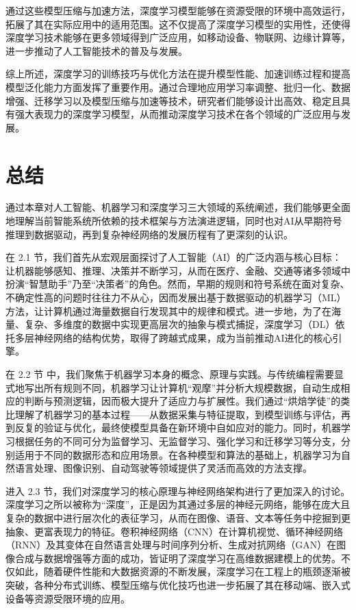通过这些模型压缩与加速方法，深度学习模型能够在资源受限的环境中高效运行，拓展了其在实际应用中的适用范围。这不仅提高了深度学习模型的实用性，还使得深度学习技术能够在更多领域得到广泛应用，如移动设备、物联网、边缘计算等，进一步推动了人工智能技术的普及与发展。

综上所述，深度学习的训练技巧与优化方法在提升模型性能、加速训练过程和提高模型泛化能力方面发挥了重要作用。通过合理地应用学习率调整、批归一化、数据增强、迁移学习以及模型压缩与加速等技术，研究者们能够设计出高效、稳定且具有强大表现力的深度学习模型，从而推动深度学习技术在各个领域的广泛应用与发展。

\section{总结}
通过本章对人工智能、机器学习和深度学习三大领域的系统阐述，我们能够更全面地理解当前智能系统所依赖的技术框架与方法演进逻辑，同时也对AI从早期符号推理到数据驱动，再到复杂神经网络的发展历程有了更深刻的认识。

在 2.1 节，我们首先从宏观层面探讨了人工智能（AI）的广泛内涵与核心目标：让机器能够感知、推理、决策并不断学习，从而在医疗、金融、交通等诸多领域中扮演“智慧助手”乃至“决策者”的角色。然而，早期的规则和符号系统在面对复杂、不确定性高的问题时往往力不从心，因而发展出基于数据驱动的机器学习（ML）方法，让计算机通过海量数据自行发现其中的规律和模式。进一步地，为了在海量、复杂、多维度的数据中实现更高层次的抽象与模式捕捉，深度学习（DL）依托多层神经网络的结构优势，取得了跨越式成果，成为当前推动AI进化的核心引擎。

在 2.2 节 中，我们聚焦于机器学习本身的概念、原理与实践。与传统编程需要显式地写出所有规则不同，机器学习让计算机“观摩”并分析大规模数据，自动生成相应的判断与预测逻辑，因而极大提升了适应力与扩展性。我们通过“烘焙学徒”的类比理解了机器学习的基本过程——从数据采集与特征提取，到模型训练与评估，再到反复的验证与优化，最终使模型具备在新环境中自如应对的能力。同时，机器学习根据任务的不同可分为监督学习、无监督学习、强化学习和迁移学习等分支，分别适用于不同的数据形态和应用场景。在各种模型和算法的基础上，机器学习为自然语言处理、图像识别、自动驾驶等领域提供了灵活而高效的方法支撑。

进入 2.3 节，我们对深度学习的核心原理与神经网络架构进行了更加深入的讨论。深度学习之所以被称为“深度”，正是因为其通过多层的神经元网络，能够在庞大且复杂的数据中进行层次化的表征学习，从而在图像、语音、文本等任务中挖掘到更抽象、更富表现力的特征。卷积神经网络（CNN）在计算机视觉、循环神经网络（RNN）及其变体在自然语言处理与时间序列分析、生成对抗网络（GAN）在图像合成与数据增强等方面的成功，皆证明了深度学习在高维数据建模上的优势。不仅如此，随着硬件性能和大数据资源的不断发展，深度学习在工程上的瓶颈逐渐被突破，各种分布式训练、模型压缩与优化技巧也进一步拓展了其在移动端、嵌入式设备等资源受限环境的应用。

